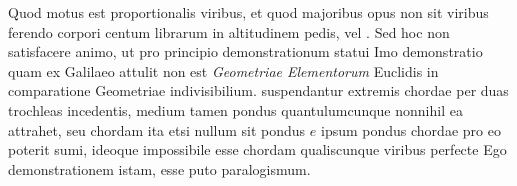 Quod motus est proportionalis viribus,
et quod majoribus opus non sit viribus ferendo corpori centum librarum in altitudinem pedis, vel . Sed hoc non satisfacere animo, ut pro principio demonstrationum statui  Imo demonstratio quam ex Galilaeo\protect{}
attulit non est  \textit{Geometriae Elementorum} Euclidis\protect{}
in comparatione Geometriae indivisibilium. 
\pend 
\pstart {}  suspendantur extremis chordae per duas trochleas incedentis, medium tamen pondus quantulumcunque nonnihil ea attrahet, seu chordam  ita etsi nullum sit pondus $e$ ipsum pondus chordae pro eo pot\-erit sumi, ideoque impossibile esse chordam qualiscunque viribus perfecte  Ego demonstrationem istam, esse puto paralogismum.
